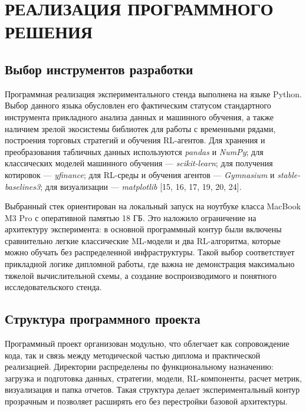 \clearpage
\section{РЕАЛИЗАЦИЯ ПРОГРАММНОГО РЕШЕНИЯ}

\subsection{Выбор инструментов разработки}

Программная реализация экспериментального стенда выполнена на языке Python. Выбор данного языка обусловлен его фактическим статусом стандартного инструмента прикладного анализа данных и машинного обучения, а также наличием зрелой экосистемы библиотек для работы с временными рядами, построения торговых стратегий и обучения RL-агентов. Для хранения и преобразования табличных данных используются \textit{pandas} и \textit{NumPy}; для классических моделей машинного обучения — \textit{scikit-learn}; для получения котировок — \textit{yfinance}; для RL-среды и обучения агентов — \textit{Gymnasium} и \textit{stable-baselines3}; для визуализации — \textit{matplotlib} [15, 16, 17, 19, 20, 24].

Выбранный стек ориентирован на локальный запуск на ноутбуке класса MacBook M3 Pro с оперативной памятью 18 ГБ. Это наложило ограничение на архитектуру эксперимента: в основной программный контур были включены сравнительно легкие классические ML-модели и два RL-алгоритма, которые можно обучать без распределенной инфраструктуры. Такой выбор соответствует прикладной логике дипломной работы, где важна не демонстрация максимально тяжелой вычислительной схемы, а создание воспроизводимого и понятного исследовательского стенда.

\subsection{Структура программного проекта}

Программный проект организован модульно, что облегчает как сопровождение кода, так и связь между методической частью диплома и практической реализацией. Директории распределены по функциональному назначению: загрузка и подготовка данных, стратегии, модели, RL-компоненты, расчет метрик, визуализация и папка отчетов. Такая структура делает экспериментальный контур прозрачным и позволяет расширять его без перестройки базовой архитектуры.

\begin{table}[H]
\caption{Основные модули программного проекта}
\label{tab:project_modules}

\end{table}

